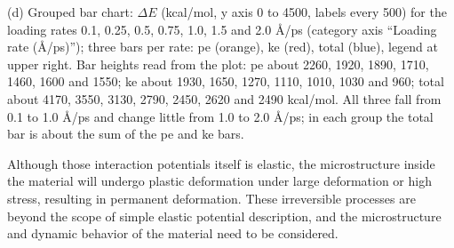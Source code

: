 \documentclass{article}
\begin{document}
{(d) Grouped bar chart: $\Delta E$ (kcal/mol, y axis 0 to 4500, labels every 500) for the loading rates 0.1, 0.25, 0.5, 0.75, 1.0, 1.5 and 2.0 Å/ps (category axis ``Loading rate (Å/ps)''); three bars per rate: pe (orange), ke (red), total (blue), legend at upper right. Bar heights read from the plot: pe about 2260, 1920, 1890, 1710, 1460, 1600 and 1550; ke about 1930, 1650, 1270, 1110, 1010, 1030 and 960; total about 4170, 3550, 3130, 2790, 2450, 2620 and 2490 kcal/mol. All three fall from 0.1 to 1.0 Å/ps and change little from 1.0 to 2.0 Å/ps; in each group the total bar is about the sum of the pe and ke bars.}

\begin{hangpars}
\hspace*{1.5em}Although those interaction potentials itself is elastic, the microstructure inside the material will undergo plastic deformation under large deformation or high stress, resulting in permanent deformation. These irreversible processes are beyond the scope of simple elastic potential description, and the microstructure and dynamic behavior of the material need to be considered.
\end{hangpars}
\end{document}
